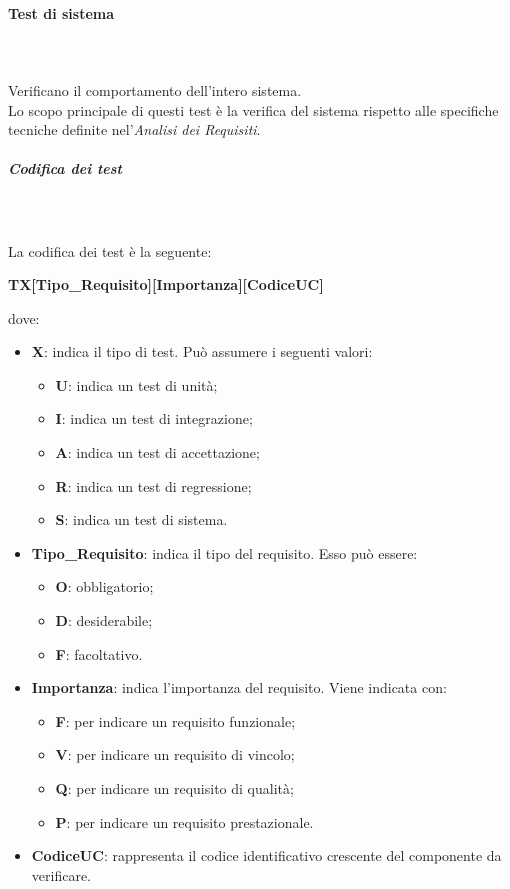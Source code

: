 \paragraph*{Test di sistema} \mbox{} \\ \mbox{} \\
Verificano il comportamento dell'intero sistema.\\
Lo scopo principale di questi test è la verifica del sistema rispetto alle specifiche tecniche definite nel'\textit{Analisi dei Requisiti}.

\subparagraph*{Codifica dei test} \mbox{} \\ \mbox{} \\
La codifica dei test è la seguente: \\
\centerline{\textbf{TX[Tipo\_Requisito][Importanza][CodiceUC]}}
dove: \begin{itemize}
\item \textbf{X}: indica il tipo di test. Può assumere i seguenti valori: \begin{itemize}
\item \textbf{U}: indica un test di unità;
\item \textbf{I}: indica un test di integrazione;
\item \textbf{A}: indica un test di accettazione;
\item \textbf{R}: indica un test di regressione;
\item \textbf{S}: indica un test di sistema.
\end{itemize} 
\item \textbf{Tipo\_Requisito}: indica il tipo del requisito. Esso può essere: \begin{itemize}
\item \textbf{O}: obbligatorio;
\item \textbf{D}: desiderabile;
\item \textbf{F}: facoltativo.
\end{itemize}
\item \textbf{Importanza}: indica l'importanza del requisito. Viene indicata con: \begin{itemize}
\item \textbf{F}: per indicare un requisito funzionale;
\item \textbf{V}: per indicare un requisito di vincolo;
\item \textbf{Q}: per indicare un requisito di qualità;
\item \textbf{P}: per indicare un requisito prestazionale.
\end{itemize}
\item \textbf{CodiceUC}: rappresenta il codice identificativo crescente del componente da verificare.
\end{itemize}

